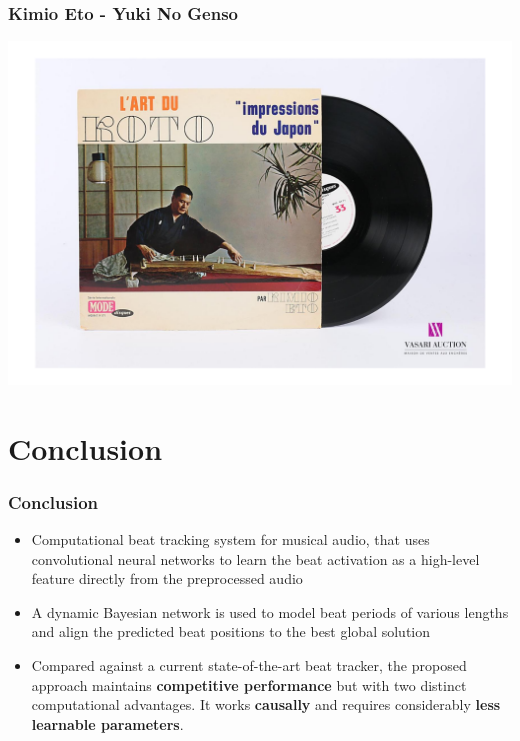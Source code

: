 \documentclass{beamer}
\begin{document}
\begin{frame}
\frametitle{Kimio Eto - Yuki No Genso}
\begin{minipage}{\textwidth} 
\centering
\includegraphics[width=\textwidth]{figures/l'art_du_koto.png}
\end{minipage}
\end{frame}








\section{Conclusion}

\begin{frame}
\frametitle{Conclusion}
\begin{itemize}
\item Computational beat tracking system for musical audio, that uses convolutional neural networks to learn the beat activation as a high-level feature directly from the preprocessed audio
\item A dynamic Bayesian network is used to model beat periods of various lengths and align the predicted beat positions to the best global solution
\item Compared against a current state-of-the-art beat tracker, the proposed approach maintains \textbf{competitive performance} but with two distinct computational advantages. It works \textbf{causally} and requires considerably \textbf{less learnable parameters}. 
\end{itemize}
\end{frame}
\end{document}
